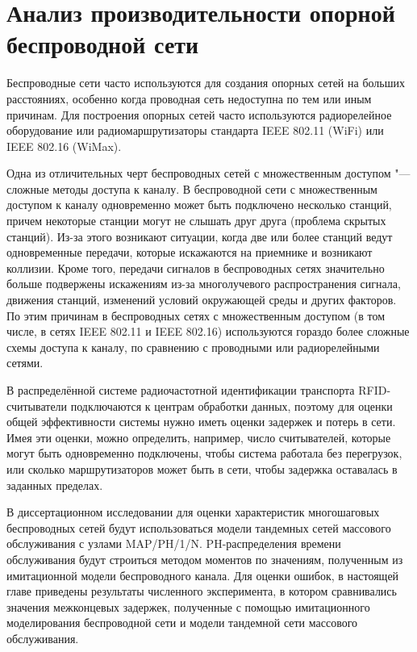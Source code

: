 \chapter{Анализ производительности опорной беспроводной сети}\label{ch:ch4}
Беспроводные сети часто используются для создания опорных сетей на больших расстояниях, особенно когда проводная сеть недоступна по тем или иным причинам. Для построения опорных сетей часто используются радиорелейное оборудование или радиомаршрутизаторы стандарта IEEE 802.11 (WiFi) или IEEE 802.16 (WiMax).

Одна из отличительных черт беспроводных сетей с множественным доступом "--- сложные методы доступа к каналу. В беспроводной сети с множественным доступом к каналу одновременно может быть подключено несколько станций, причем некоторые станции могут не слышать друг друга (проблема скрытых станций). Из-за этого возникают ситуации, когда две или более станций ведут одновременные передачи, которые искажаются на приемнике и возникают коллизии. Кроме того, передачи сигналов в беспроводных сетях значительно больше подвержены искажениям из-за многолучевого распространения сигнала, движения станций, изменений условий окружающей среды и других факторов. По этим причинам в беспроводных сетях с множественным доступом (в том числе, в сетях IEEE 802.11 и IEEE 802.16) используются гораздо более сложные схемы доступа к каналу, по сравнению с проводными или радиорелейными сетями.

В распределённой системе радиочастотной идентификации транспорта RFID-считыватели подключаются к центрам обработки данных, поэтому для оценки общей эффективности системы нужно иметь оценки задержек и потерь в сети. Имея эти оценки, можно определить, например, число считывателей, которые могут быть одновременно подключены, чтобы система работала без перегрузок, или сколько маршрутизаторов может быть в сети, чтобы задержка оставалась в заданных пределах.

В диссертационном исследовании для оценки характеристик многошаговых беспроводных сетей будут использоваться модели тандемных сетей массового обслуживания с узлами MAP/PH/1/N. PH-распределения времени обслуживания будут строиться методом моментов по значениям, полученным из имитационной модели беспроводного канала. Для оценки ошибок, в настоящей главе приведены результаты численного эксперимента, в котором сравнивались значения межконцевых задержек, полученные с помощью имитационного моделирования беспроводной сети и модели тандемной сети массового обслуживания.

